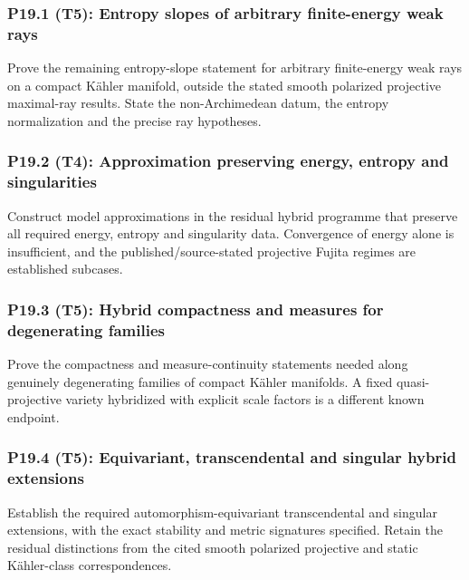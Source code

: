 \documentclass[11pt,a4paper]{article}
\theoremstyle{definition}
\theoremstyle{remark}
\begin{document}
\subsubsection*{P19.1 (T5): Entropy slopes of arbitrary finite-energy weak rays}
\label{atom:P19.1}
Prove the remaining entropy-slope statement for arbitrary finite-energy weak rays on a compact K\"ahler manifold, outside the stated smooth polarized projective maximal-ray results. State the non-Archimedean datum, the entropy normalization and the precise ray hypotheses.

\subsubsection*{P19.2 (T4): Approximation preserving energy, entropy and singularities}
\label{atom:P19.2}
Construct model approximations in the residual hybrid programme that preserve all required energy, entropy and singularity data. Convergence of energy alone is insufficient, and the published/source-stated projective Fujita regimes are established subcases.

\subsubsection*{P19.3 (T5): Hybrid compactness and measures for degenerating families}
\label{atom:P19.3}
Prove the compactness and measure-continuity statements needed along genuinely degenerating families of compact K\"ahler manifolds. A fixed quasi-projective variety hybridized with explicit scale factors is a different known endpoint.

\subsubsection*{P19.4 (T5): Equivariant, transcendental and singular hybrid extensions}
\label{atom:P19.4}
Establish the required automorphism-equivariant transcendental and singular extensions, with the exact stability and metric signatures specified. Retain the residual distinctions from the cited smooth polarized projective and static K\"ahler-class correspondences.
\end{document}
